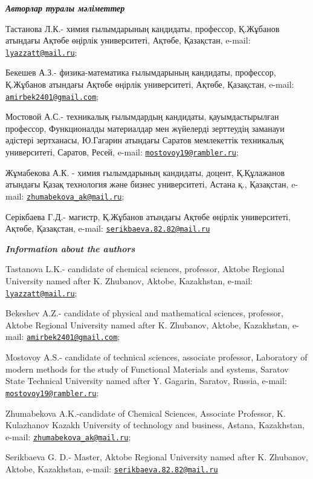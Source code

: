 \begin{authorinfo}
\hspace{1em}\emph{{\bfseries Авторлар туралы мәліметтер}}

Тастанова Л.К.- химия ғылымдарының кандидаты, профессор, Қ.Жұбанов
атындағы Ақтөбе өңірлік университеті, Ақтөбе, Қазақстан, e-mail:
\href{mailto:lyazzatt@mail.ru}{\nolinkurl{lyazzatt@mail.ru}};

Бекешев А.З.- физика-математика ғылымдарының кандидаты, профессор,
Қ.Жұбанов атындағы Ақтөбе өңірлік университеті, Ақтөбе, Қазақстан,
e-mail:
\href{mailto:amirbek2401@gmail.com}{\nolinkurl{amirbek2401@gmail.com}};

Мостовой А.С.- техникалық ғылымдардың кандидаты, қауымдастырылған
профессор, Функционалды материалдар мен жүйелерді зерттеудің заманауи
әдістері зертханасы, Ю.Гагарин атындағы Саратов мемлекеттік техникалық
университеті, Саратов, Ресей, e-mail:
\href{mailto:mostovoy19@rambler.ru}{\nolinkurl{mostovoy19@rambler.ru}};

Жұмабекова А.К. - химия ғылымдарының кандидаты, доцент, Қ.Құлажанов
атындағы Қазақ технология және бизнес университеті, Астана қ.,
Қазақстан, e-mail:
\href{mailto:zhumabekova_ak@mail.ru}{\nolinkurl{zhumabekova\_ak@mail.ru}};

Серікбаева Г.Д.- магистр, Қ.Жұбанов атындағы Ақтөбе өңірлік
университеті, Ақтөбе, Қазақстан, e-mail:
\href{mailto:serikbaeva.82.82@mail.ru}{\nolinkurl{serikbaeva.82.82@mail.ru}}

\hspace{1em}\emph{{\bfseries Information about the authors}}

Tastanova L.K.- candidate of chemical sciences, professor, Aktobe
Regional University named after K. Zhubanov, Aktobe, Kazakhstan, e-mail:
\href{mailto:lyazzatt@mail.ru}{\nolinkurl{lyazzatt@mail.ru}};

Bekeshev A.Z.- candidate of physical and mathematical sciences,
professor, Aktobe Regional University named after K. Zhubanov, Aktobe,
Kazakhstan, e-mail:
\href{mailto:amirbek2401@gmail.com}{\nolinkurl{amirbek2401@gmail.com}};

Mostovoy A.S.- candidate of technical sciences, associate professor,
Laboratory of modern methods for the study of Functional Materials and
systems, Saratov State Technical University named after Y. Gagarin,
Saratov, Russia, e-mail:
\href{mailto:mostovoy19@rambler.ru}{\nolinkurl{mostovoy19@rambler.ru}};

Zhumabekova A.K.-candidate of Chemical Sciences, Associate Professor, K.
Kulazhanov Kazakh University of technology and business, Astana,
Kazakhstan, e-mail:
\href{mailto:zhumabekova_ak@mail.ru}{\nolinkurl{zhumabekova\_ak@mail.ru}};

Serikbaeva G. D.- Master, Aktobe Regional University named after K.
Zhubanov, Aktobe, Kazakhstan, e-mail:
\href{mailto:serikbaeva.82.82@mail.ru}{\nolinkurl{serikbaeva.82.82@mail.ru}}
\end{authorinfo}
